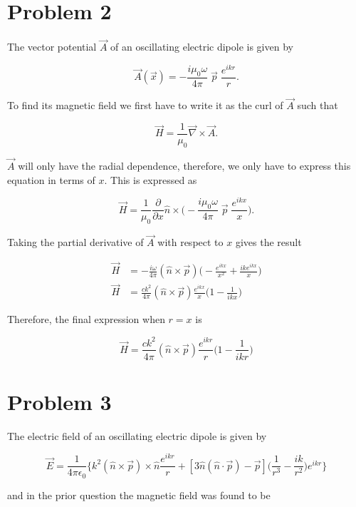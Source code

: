 \documentclass[11pt]{article}
\begin{document}
\clearpage

\section*{Problem 2}

The vector potential $\vec{A}$ of an oscillating electric dipole is given by 

$$
\vec{A}(\vec{x}) = -\frac{i\mu_{0} \omega}{4\pi} \; \vec{p} \; \frac{e^{ikr}}{r}.
$$

To find its magnetic field we first have to write it as the curl of $\vec{A}$ such that

$$
\vec{H} = \frac{1}{\mu_{0}} \vec{\nabla} \times \vec{A}.
$$

$\vec{A}$ will only have the radial dependence, therefore, we only have to express this equation in terms of $x$. This is expressed as

$$
\vec{H} = \frac{1}{\mu_{0}}  \frac{\partial}{\partial x} \hat{n} \times \Bigg( -\frac{i\mu_{0}\omega}{4\pi} \; \vec{p} \; \frac{e^{ikx}}{x} \Bigg).
$$

Taking the partial derivative of $\vec{A}$ with respect to $x$ gives the result

\begin{align*}
    \vec{H} &= -\frac{i\omega}{4\pi} (\hat{n} \times \vec{p}) \Bigg(-\frac{e^{ikx}}{x^{2}} + \frac{ike^{ikx}}{x}\Bigg) \\
    \vec{H} &= \frac{ck^{2}}{4\pi} (\hat{n} \times \vec{p}) \frac{e^{ikx}}{x} \Bigg(1 - \frac{1}{ikx}\Bigg)
\end{align*}

Therefore, the final expression when $r = x$ is

$$
    \vec{H} = \frac{ck^{2}}{4\pi} (\hat{n} \times \vec{p}) \frac{e^{ikr}}{r} \Bigg(1 - \frac{1}{ikr}\Bigg)
$$

\clearpage

\section*{Problem 3}

The electric field of an oscillating electric dipole is given by

$$
\vec{E} = \frac{1}{4\pi \epsilon_{0}} \Bigg\{ k^{2} (\hat{n} \times \vec{p}) \times \hat{n} \frac{e^{ikr}}{r} + [3\hat{n}(\hat{n} \cdot \vec{p}) - \vec{p}] \Bigg(\frac{1}{r^{3}} - \frac{ik}{r^{2}}\Bigg )e^{ikr} \Bigg\}
$$

and in the prior question the magnetic field was found to be
\end{document}
